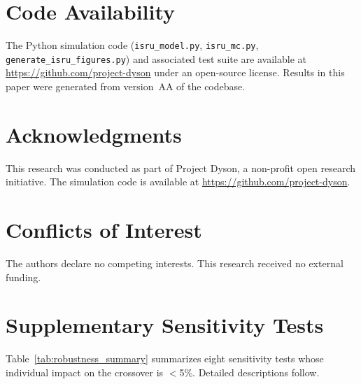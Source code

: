 \documentclass[preprint,12pt]{elsarticle}
\begin{document}
\section*{Code Availability}

The Python simulation code (\texttt{isru\_model.py}, \texttt{isru\_mc.py}, \texttt{generate\_isru\_figures.py}) and associated test suite are available at \url{https://github.com/project-dyson} under an open-source license. Results in this paper were generated from version~AA of the codebase.


\section*{Acknowledgments}

This research was conducted as part of Project Dyson, a non-profit open research initiative. The simulation code is available at \url{https://github.com/project-dyson}.

\section*{Conflicts of Interest}

The authors declare no competing interests. This research received no external funding.

\appendix
\section{Supplementary Sensitivity Tests}
\label{sec:appendix_sensitivity}

Table~\ref{tab:robustness_summary} summarizes eight sensitivity tests whose individual impact on the crossover is $<$5\%. Detailed descriptions follow.
\end{document}
